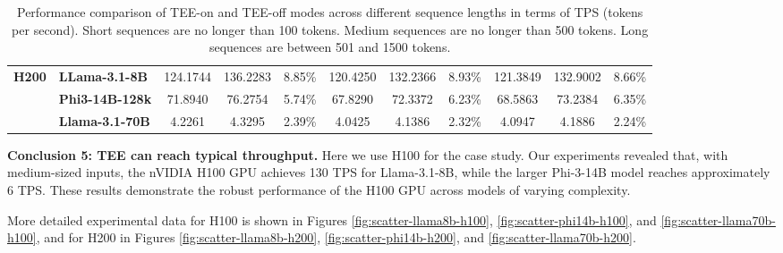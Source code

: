 \documentclass{article}
\begin{document}
\begin{table}[htbp]
{\begin{tabular}{llccc|ccc|ccc}
            \midrule
            \multirow{3}{*}{\textbf{H200}} & \textbf{LLama-3.1-8B}  & 124.1744                                            & 136.2283                                             & 8.85\%                                             & 120.4250        & 132.2366         & 8.93\%                                                                     & 121.3849        & 132.9002         & 8.66\%                                                                     \\
            & \textbf{Phi3-14B-128k} & 71.8940                                             & 76.2754                                              & 5.74\%                                             & 67.8290         & 72.3372          & 6.23\%                                                                     & 68.5863         & 73.2384          & 6.35\%                                                                     \\
            & \textbf{Llama-3.1-70B} & 4.2261                                              & 4.3295                                               & 2.39\%                                             & 4.0425          & 4.1386           & 2.32\%                                                                     & 4.0947          & 4.1886          & 2.24\%                                                                     \\
            \bottomrule
        \end{tabular}%
    }
    \caption{Performance comparison of TEE-on and TEE-off modes across different sequence lengths in terms of TPS (tokens per second). Short sequences are no longer than 100 tokens. Medium sequences are no longer than 500 tokens. Long sequences are between 501 and 1500 tokens.}
    \label{tab:tps_short_medium_long}
\end{table}

\noindent\textbf{Conclusion 5: TEE can reach typical throughput.}
Here we use H100 for the case study. Our experiments revealed that, with medium-sized inputs, the nVIDIA H100 GPU achieves 130 TPS for Llama-3.1-8B, while the larger Phi-3-14B model reaches approximately 6 TPS. These results demonstrate the robust performance of the H100 GPU across models of varying complexity.

More detailed experimental data for H100 is shown in Figures \ref{fig:scatter-llama8b-h100}, \ref{fig:scatter-phi14b-h100}, and \ref{fig:scatter-llama70b-h100}, and for H200 in Figures \ref{fig:scatter-llama8b-h200}, \ref{fig:scatter-phi14b-h200}, and \ref{fig:scatter-llama70b-h200}.
\end{document}

